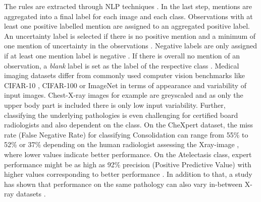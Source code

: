 The rules are extracted through NLP techniques \citep{Irvin2019}.
In the last step, mentions are aggregated into a final label for each image and each class.
Observations with at least one positive labelled mention are assigned to an aggregated positive label.
An uncertainty label is selected if there is no positive mention and a minimum of one mention of uncertainty in the observations \citep{Irvin2019}.
Negative labels are only assigned if at least one mention label is negative \citep{Irvin2019}. 
If there is overall no mention of an observation, a \textit{blank} label is set as the label of the respective class \citep{Irvin2019}.
Medical imaging datasets differ from commonly used computer vision benchmarks like CIFAR-10 \citep{Krizhevsky2009a}, CIFAR-100 \citep{Krizhevsky2009b} or ImageNet \citep{Deng2009} in terms of appearance and variability of input images.
Chest-X-ray images for example are greyscaled and as only the upper body part is included there is only low input variability.
Further, classifying the underlying pathologies is even challenging for certified board radiologists and also dependent on the class.
On the CheXpert dataset, the miss rate (False Negative Rate) for classifying Consolidation can range from 55\% to 52\% or 37\% depending on the human radiologist assessing the Xray-image \citep{Irvin2019}, where lower values indicate better performance.
On the Atelectasis class, expert performance might be as high as 92\% precision (Positive Predictive Value) with higher values corresponding to better performance \citep{Irvin2019}.
In addition to that, a study has shown that performance on the same pathology can also vary in-between X-ray datasets \citep{Majkowska2020}.
\par
